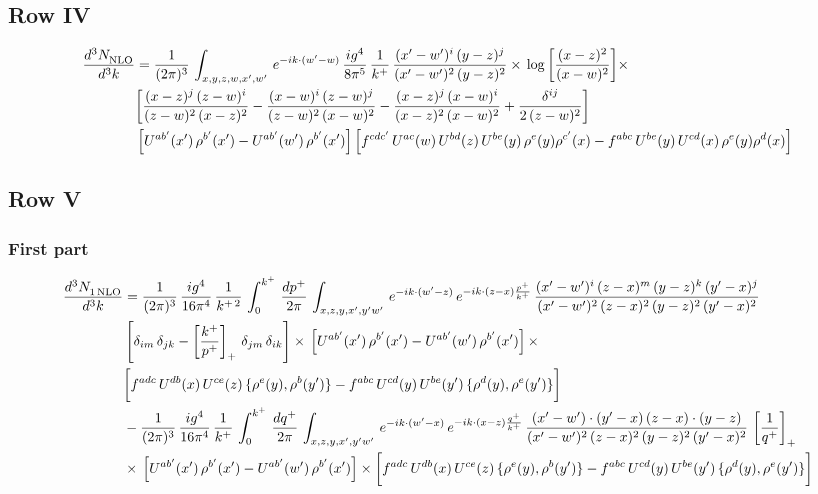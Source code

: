 \documentclass[9pt]{article}
\numberwithin{equation}{section}
\begin{document}
\subsection{Row IV}
\begin{align}
    \frac{d^{3}N_{\rm NLO}^{\rm}}{d^{3}k}  & =   \frac{1}{(2\pi)^{3}}\,
    \int_{x,y,z,w,x',w'}\,e^{-ik\cdot (w^\prime-w)}\, \frac{ig^{4}}{8\pi^{5}}\,\frac{1}{k^{+}}\,\frac{(x'-w')^{i}\,(y-z)^{j}}{(x'-w')^{2}\,(y-z)^{2}}\times\,\log{\left[\frac{(x-z)^{2}}{(x-w)^{2}}\right]}\times\notag \\ &  \bigg[\frac{(x-z)^{j}\,(z-w)^{i}}{(z-w)^{2}\,(x-z)^{2}} -\frac{(x-w)^{i}\,(z-w)^{j}}{(z-w)^{2}\,(x-w)^{2}}-\frac{(x-z)^{j}\,(x-w)^{i}}{(x-z)^{2}\,(x-w)^{2}}+\frac{\delta^{ij}}{2\,(z-w)^{2}}\bigg]\notag \\ &  \left[U^{ab'}(x')\,\rho^{b'}(x')-U^{ab'}(w')\,\rho^{b'}(x')\right] \left[f^{cdc'}\,U^{ac}(w)\,U^{bd}(z)\,U^{be}(y)\,\rho^{e}(y)\rho^{c'}(x)-f^{abc}\,U^{be}(y)\,U^{cd}(x)\,\rho^{e}(y)\rho^{d}(x)\right]
\end{align}
\subsection{Row V}
\subsubsection*{First part}
\begin{align}
     \frac{d^{3}N_{1\,\rm NLO}^{\rm}}{d^{3}k}  & =  \frac{1}{(2\pi)^{3}}\, \frac{ig^{4}}{16\pi^{4}}\, \frac{1}{k^{+\,2}}\,\int_{0}^{k^{+}}\, \frac{dp^{+}}{2\pi}\,\int_{x,z,y,x',y'w'}\,e^{-ik\cdot (w^\prime-z)}\,e^{-ik\cdot (z-x)\frac{p^{+}}{k^{+}}}\,\frac{(x'-w')^{i}\,(z-x)^{m}\,(y-z)^{k}\,(y'-x)^{j}}{(x'-w')^{2}\,(z-x)^{2}\,(y-z)^{2}\,(y'-x)^{2}}\,\notag \\ & \left[\delta_{im}\,\delta_{jk}-\left[\frac{k^{+}}{p^{+}}\right]_{+}\, \delta_{jm}\,\delta_{ik}\right]\times\, \left[U^{ab'}(x')\,\rho^{b'}(x')-U^{ab'}(w')\,\rho^{b'}(x')\right]\times\notag \\ & \bigg[f^{adc}\,U^{db}(x)\,U^{ce}(z)\, \{\rho^{e}(y),\rho^{b}(y')\}-f^{abc}\,U^{cd}(y)\,U^{be}(y')\, \{\rho^{d}(y),\rho^{e}(y')\}\bigg] \notag \\ & -\frac{1}{(2\pi)^{3}}\, \frac{ig^{4}}{16\pi^{4}}\, \frac{1}{k^{+}}\,\int_{0}^{k^{+}}\, \frac{dq^{+}}{2\pi}\,\int_{x,z,y,x',y'w'}\,e^{-ik\cdot (w^\prime-x)}\,e^{-ik\cdot (x-z)\frac{q^{+}}{k^{+}}}\,\frac{(x'-w')\cdot (y'-x)\,(z-x)\cdot (y-z)}{(x'-w')^{2}\,(z-x)^{2}\,(y-z)^{2}\,(y'-x)^{2}}\,\left[\frac{1}{q^{+}}\right]_{+}\notag \\ & \times\, \left[U^{ab'}(x')\,\rho^{b'}(x')-U^{ab'}(w')\,\rho^{b'}(x')\right]\times \bigg[f^{adc}\,U^{db}(x)\,U^{ce}(z)\, \{\rho^{e}(y),\rho^{b}(y')\}-f^{abc}\,U^{cd}(y)\,U^{be}(y')\, \{\rho^{d}(y),\rho^{e}(y')\}\bigg]
\end{align}
\end{document}
